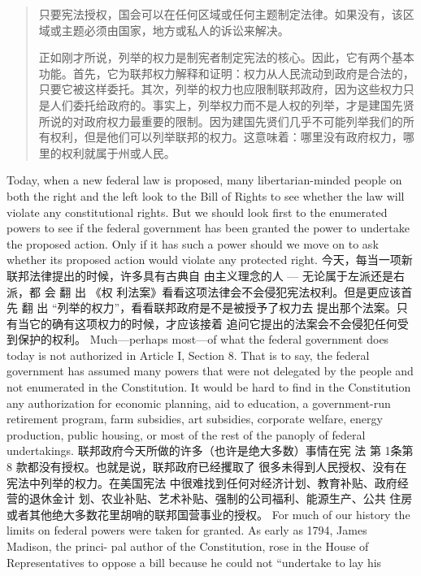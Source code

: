 \begin{paracol}{2}
\switchcolumn
\begin{quotation}
只要宪法授权，国会可以在任何区域或任何主题制定法律。如果没有，该区域或主题必须由国家，地方或私人的诉讼来解决。

正如刚才所说，列举的权力是制宪者制定宪法的核心。因此，它有两个基本功能。首先，它为联邦权力解释和证明：权力从人民流动到政府是合法的，只要它被这样委托。其次，列举的权力也应限制联邦政府，因为这些权力只是人们委托给政府的。事实上，列举权力而不是人权的列举，才是建国先贤所说的对政府权力最重要的限制。因为建国先贤们几乎不可能列举我们的所有权利，但是他们可以列举联邦的权力。这意味着：哪里没有政府权力，哪里的权利就属于州或人民。
\end{quotation}
\switchcolumn*
Today, when a new federal law is proposed, many libertarian-minded people on both the right and the left look to the Bill of
Rights to see whether the law will violate any constitutional
rights. But we should look first to the enumerated powers to see
if the federal government has been granted the power to undertake the proposed action. Only if it has such a power should we
move on to ask whether its proposed action would violate any
protected right.
\switchcolumn
今天，每当一项新联邦法律提出的时候，许多具有古典自
由主义理念的人 --- 无论属于左派还是右派，都 会 翻 出 《权
利法案》看看这项法律会不会侵犯宪法权利。但是更应该首
先 翻 出 “列举的权力”，看看联邦政府是不是被授予了权力去
提出那个法案。只有当它的确有这项权力的时候，才应该接着
追问它提出的法案会不会侵犯任何受到保护的权利。
\switchcolumn*
Much---perhaps most---of what the federal government
does today is not authorized in Article I, Section 8. That is to
say, the federal government has assumed many powers that
were not delegated by the people and not enumerated in the
Constitution. It would be hard to find in the Constitution any
authorization for economic planning, aid to education, a government-run retirement program, farm subsidies, art subsidies,
corporate welfare, energy production, public housing, or most
of the rest of the panoply of federal undertakings.
\switchcolumn
联邦政府今天所做的许多（也许是绝大多数）事情在宪
法 第 1条第8 款都没有授权。也就是说，联邦政府已经攫取了
很多未得到人民授权、没有在宪法中列举的权力。在美国宪法
中很难找到任何对经济计划、教育补贴、政府经营的退休金计
划、农业补贴、艺术补贴、强制的公司福利、能源生产、公共
住房或者其他绝大多数花里胡哨的联邦国营事业的授权。
\switchcolumn*
For much of our history the limits on federal powers were taken for granted. As early as 1794, James Madison, the princi-
pal author of the Constitution, rose in the House of Representatives to oppose a bill because he could not ``undertake to lay his

\end{paracol}

